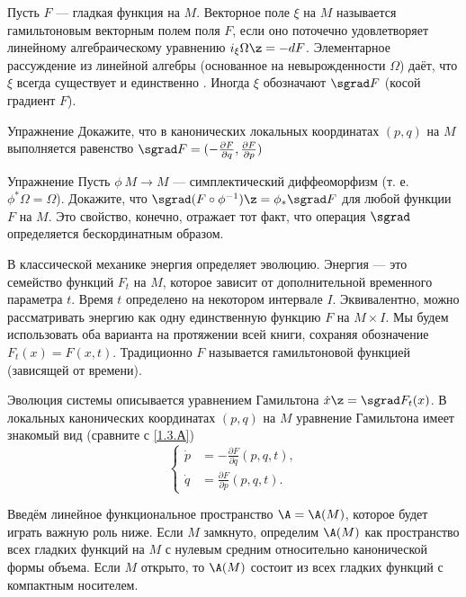 Пусть $F$ --- гладкая функция на $M$.
Векторное поле $\xi$ на $M$ называется гамильтоновым векторным полем поля $F$, если оно поточечно удовлетворяет линейному алгебраическому уравнению $i_\xi \Omega \z= -dF$.
Элементарное рассуждение из линейной алгебры (основанное на невырожденности $\Omega$) даёт, что $\xi$ всегда существует и единственно \cite{MS}.
Иногда $\xi$ обозначают $\sgrad F$ (косой градиент $F$).

\begin{thm}{Упражнение}\label{1.3.А}
Докажите, что в канонических локальных координатах $(p, q)$ на
$M$ выполняется равенство  $\sgrad F = (-\tfrac{\partial F}{\partial q},\tfrac{\partial F}{\partial p})$
\end{thm}

\begin{thm}{Упражнение}\label{1.3.B}
Пусть  $\phi\: M \to M$ --- симплектический диффеоморфизм
(т. е. $\phi^\ast \Omega = \Omega$).
Докажите, что $\sgrad (F \circ \phi^{-1}) \z= \phi_\ast \sgrad F$ для любой функции $F$ на $M$.
Это свойство, конечно, отражает тот факт, что операция $\sgrad$ определяется бескординатным образом.
\end{thm}


В классической механике энергия определяет эволюцию.
Энергия --- это семейство функций $F_t$ на $M$, которое зависит от дополнительной временного параметра $t$.
Время $t$ определено на некотором интервале $I$.
Эквивалентно, можно рассматривать энергию как одну единственную функцию $F$ на $M \times I$.
Мы будем использовать оба варианта на протяжении всей книги, сохраняя обозначение $F_t (x) = F (x, t)$.
Традиционно $F$ называется гамильтоновой функцией (зависящей от времени).

Эволюция системы описывается уравнением Гамильтона $\dot x \z= \sgrad F_t (x)$.
В локальных канонических координатах $(p, q)$ на $M$ уравнение Гамильтона имеет знакомый вид (сравните с
\ref{1.3.А})
\[
\begin{cases}
\dot p &= - \tfrac{\partial F}{\partial q} (p, q, t),\\
\dot q &= \tfrac{\partial F}{\partial p} (p, q, t).
\end{cases}
\]

Введём линейное функциональное пространство $\A = \A (M)$, которое будет играть важную роль ниже.
Если $M$ замкнуто, определим $\A(M)$ как пространство всех гладких функций на $M$ с нулевым средним относительно канонической формы объема.
Если $M$ открыто, то $\A(M)$ состоит из всех гладких функций с компактным носителем.

